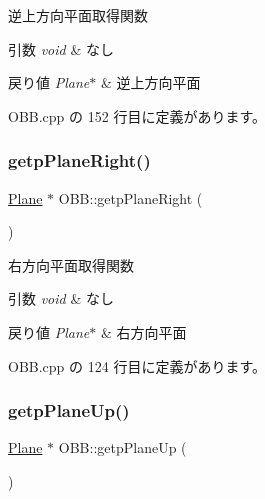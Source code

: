 逆上方向平面取得関数 


\begin{DoxyParams}{引数}
{\em void} & なし \\
\hline
\end{DoxyParams}

\begin{DoxyRetVals}{戻り値}
{\em Plane$\ast$} & 逆上方向平面 \\
\hline
\end{DoxyRetVals}


 O\+B\+B.\+cpp の 152 行目に定義があります。

\mbox{\label{class_o_b_b_a1298de54379efa036a1b85bbec1be814}} 
\subsubsection{\texorpdfstring{getp\+Plane\+Right()}{getpPlaneRight()}}
{\footnotesize\ttfamily \mbox{\hyperlink{class_plane}{Plane}} $\ast$ O\+B\+B\+::getp\+Plane\+Right (\begin{DoxyParamCaption}{ }\end{DoxyParamCaption})}



右方向平面取得関数 


\begin{DoxyParams}{引数}
{\em void} & なし \\
\hline
\end{DoxyParams}

\begin{DoxyRetVals}{戻り値}
{\em Plane$\ast$} & 右方向平面 \\
\hline
\end{DoxyRetVals}


 O\+B\+B.\+cpp の 124 行目に定義があります。

\mbox{\label{class_o_b_b_a99c9311cfe163c7691852af267f28b79}} 
\subsubsection{\texorpdfstring{getp\+Plane\+Up()}{getpPlaneUp()}}
{\footnotesize\ttfamily \mbox{\hyperlink{class_plane}{Plane}} $\ast$ O\+B\+B\+::getp\+Plane\+Up (\begin{DoxyParamCaption}{ }\end{DoxyParamCaption})}



